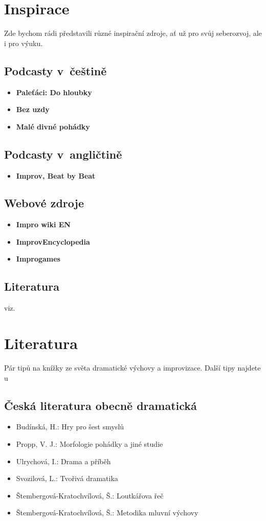 \needspace{5cm} \section{Inspirace} \label{inspirace} Zde bychom rádi představili různé inspirační zdroje, ať už pro svůj seberozvoj, ale i pro výuku. 
\subsection{ Podcasty v~češtině } \begin{itemize}
\item  \textbf{Paleťáci: Do hloubky}
\item  \textbf{Bez uzdy}
\item \textbf{Malé divné pohádky}
\end{itemize}
\subsection{ Podcasty v~angličtině } \begin{itemize}
\item  \textbf{Improv, Beat by Beat}
\end{itemize}
\subsection{ Webové zdroje } \begin{itemize}
\item  \textbf{Impro wiki EN}
\item  \textbf{ImprovEncyclopedia}
\item  \textbf{Improgames}
\end{itemize}
 
\subsection{ Literatura } viz.  
 
 
 
\needspace{5cm} \section{Literatura} \label{literatura} Pár tipů na knížky ze světa dramatické výchovy a improvizace.  
Další tipy najdete u~ 
 
\subsection{ Česká literatura obecně dramatická  } \begin{itemize}
\item  Budínská, H.: Hry pro šest smyslů
\item  Propp, V. J.: Morfologie pohádky a jiné studie
\item  Ulrychová, I.: Drama a příběh
\item  Svozilová, L.: Tvořivá dramatika
\item  Štembergová-Kratochvílová, Š.: Loutkářova řeč
\item  Štembergová-Kratochvílová, Š.: Metodika mluvní výchovy
\end{itemize}
 
